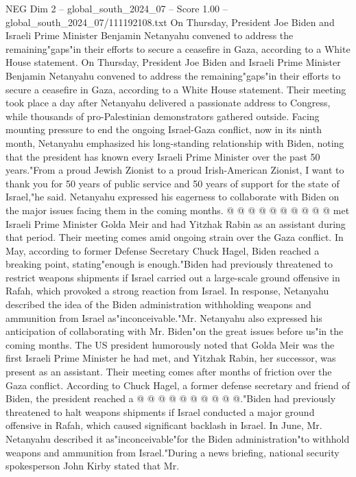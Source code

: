 \begin{textsample}{NEG Dim 2 – global\_south\_2024\_07 – Score 1.00 – global\_south\_2024\_07/111192108.txt}  \label{ex:f2_neg_285}
On Thursday, President Joe Biden and Israeli Prime Minister Benjamin Netanyahu convened to address the remaining"gaps"in their efforts to secure a ceasefire in Gaza, according to a White House statement.
On Thursday, President Joe Biden and Israeli Prime Minister Benjamin Netanyahu convened to address the remaining"gaps"in their efforts to secure a ceasefire in Gaza, according to a White House statement.
Their meeting took place a day after Netanyahu delivered a passionate address to Congress, while thousands of pro-Palestinian demonstrators gathered outside.
Facing mounting pressure to end the ongoing Israel-Gaza conflict, now in its ninth month, Netanyahu emphasized his long-standing relationship with Biden, noting that the president has known every Israeli Prime Minister over the past 50 years."From a proud Jewish Zionist to a proud Irish-American Zionist, I want to thank you for 50 years of public service and 50 years of support for the state of Israel,"he said.
Netanyahu expressed his eagerness to collaborate with Biden on the major issues facing them in the coming months. @ @ @ @ @ @ @ @ @ @ met Israeli Prime Minister Golda Meir and had Yitzhak Rabin as an assistant during that period.
Their meeting comes amid ongoing strain over the Gaza conflict.
In May, according to former Defense Secretary Chuck Hagel, Biden reached a breaking point, stating"enough is enough."Biden had previously threatened to restrict weapons shipments if Israel carried out a large-scale ground offensive in Rafah, which provoked a strong reaction from Israel.
In response, Netanyahu described the idea of the Biden administration withholding weapons and ammunition from Israel as"inconceivable."Mr.
Netanyahu also expressed his anticipation of collaborating with Mr.
Biden"on the great issues before us"in the coming months.
The US president humorously noted that Golda Meir was the first Israeli Prime Minister he had met, and Yitzhak Rabin, her successor, was present as an assistant.
Their meeting comes after months of friction over the Gaza conflict.
According to Chuck Hagel, a former defense secretary and friend of Biden, the president reached a @ @ @ @ @ @ @ @ @ @."Biden had previously threatened to halt weapons shipments if Israel conducted a major ground offensive in Rafah, which caused significant backlash in Israel.
In June, Mr.
Netanyahu described it as"inconceivable"for the Biden administration"to withhold weapons and ammunition from Israel."During a news briefing, national security spokesperson John Kirby stated that Mr.

\end{textsample}
